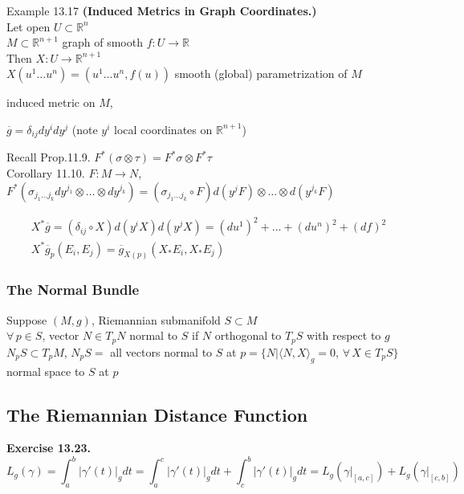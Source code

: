 \documentclass[11pt]{amsart}
\theoremstyle{definition}
\newcommand{\exercisehead}[1]{\medskip\noindent\textbf{Exercise #1.} }
\begin{document}
Example 13.17 \textbf{(Induced Metrics in Graph Coordinates.)} \\
Let open $U \subset \mathbb{R}^n$ \\
\phantom{ Let open } $M \subset \mathbb{R}^{n+1}$ graph of smooth $f:U \to \mathbb{R}$ \\

Then $X:U\to \mathbb{R}^{n+1}$ \\
\phantom{ Then }$X(u^1 \dots u^n) = (u^1 \dots u^n, f(u))$ smooth (global) parametrization of $M$

induced metric on $M$,

$\overline{g} = \delta_{ij} dy^i dy^j$ (note $y^i$ local coordinates on $\mathbb{R}^{n+1}$)

Recall Prop.11.9. $F^*(\sigma \otimes \tau) = F^*\sigma \otimes F^*\tau$ \\
Corollary 11.10.  $F:M \to N$, \\
$F^*(\sigma_{j_1 \dots j_k} dy^{j_1} \otimes \dots \otimes dy^{j_k} ) = (\sigma_{j_1 \dots j_k} \circ F) d(y^j F) \otimes \dots \otimes d(y^{j_k}F)$

\[
\begin{gathered}
  X^* \overline{g} = (\delta_{ij} \circ X) d(y^i X) d(y^jX) = (du^1)^2 + \dots + (du^n)^2 + (df)^2 \\
  X^*\overline{g}_p(E_i , E_j) = \overline{g}_{X(p)}(X_* E_i, X_* E_j)
\end{gathered}
\]


\subsubsection*{The Normal Bundle}

Suppose $(M,g)$, Riemannian submanifold $S\subset M$ \\
\quad $\forall \, p \in S$, vector $N \in T_pN$ normal to $S$ if $N$ orthogonal to $T_pS$ with respect to $g$ \\
\quad \quad $N_p S\subset T_pM$, $N_pS = $ all vectors normal to $S$ at $p = \lbrace N | \langle N, X \rangle_g = 0, \, \forall \, X \in T_pS \rbrace$ normal space to $S$ at $p$ \\



\subsection*{The Riemannian Distance Function}

\exercisehead{13.23}
\[
L_g(\gamma) = \int_a^b |\gamma'(t)|_g dt = \int_a^c |\gamma'(t)|_g dt  + \int_c^b |\gamma'(t) |_g dt = L_g(\left. \gamma \right|_{ [a,c] } ) + L_g( \left. \gamma \right|_{[c,b]} )
\]
\end{document}
